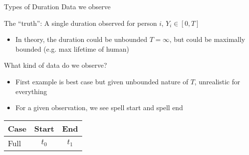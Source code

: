 \documentclass[notes,11pt, aspectratio=169]{beamer}
\newenvironment{wideitemize}{\itemize\addtolength{\itemsep}{10pt}}{\enditemize}
\begin{document}
\begin{frame}{Types of Duration Data we observe}
  \begin{wideitemize}
  \item The ``truth'': A single duration observed for person $i$, $Y_{i} \in [0, T]$
    \begin{itemize}
    \item In theory, the duration could be unbounded $T = \infty$, but
      could be maximally bounded (e.g. max lifetime of human)
    \end{itemize}
  \item What kind of data do we observe?
    \begin{itemize}
    \item First example is best case but given unbounded nature of $T$, unrealistic for everything
    \item For a given observation, we see spell start and spell end
    \end{itemize}
  \end{wideitemize}
  \begin{center}
    \begin{tabular}{lcc}
      Case & Start & End\\
      \midrule
      Full & $t_{0}$ & $t_{1}$\\
    \end{tabular}
\end{center}
\end{frame}
\end{document}
